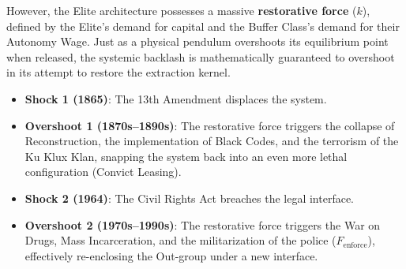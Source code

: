 \documentclass[12pt,openany]{book}
\begin{document}
However, the Elite architecture possesses a massive \textbf{restorative force} ($k$), defined by the Elite's demand for capital and the Buffer Class's demand for their Autonomy Wage. Just as a physical pendulum overshoots its equilibrium point when released, the systemic backlash is mathematically guaranteed to overshoot in its attempt to restore the extraction kernel.

\begin{itemize}
    \item \textbf{Shock 1 (1865)}: The 13th Amendment displaces the system. 
    \item \textbf{Overshoot 1 (1870s--1890s)}: The restorative force triggers the collapse of Reconstruction, the implementation of Black Codes, and the terrorism of the Ku Klux Klan, snapping the system back into an even more lethal configuration (Convict Leasing).
    
    \item \textbf{Shock 2 (1964)}: The Civil Rights Act breaches the legal interface.
    \item \textbf{Overshoot 2 (1970s--1990s)}: The restorative force triggers the War on Drugs, Mass Incarceration, and the militarization of the police ($F_{\text{enforce}}$), effectively re-enclosing the Out-group under a new interface.
\end{itemize}
\end{document}
